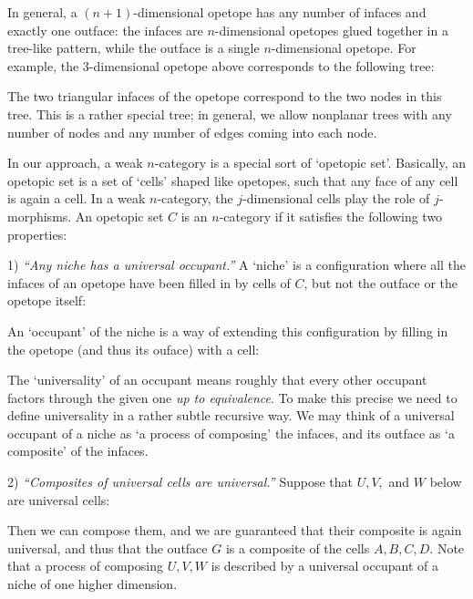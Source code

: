 In general, a $(n+1)$-dimensional opetope has any number of infaces and
exactly one outface: the infaces are $n$-dimensional opetopes glued
together in a tree-like pattern, while the outface is a single
$n$-dimensional opetope.  For example, the 3-dimensional opetope above
corresponds to the following tree:

\medskip
\centerline{\epsfysize=1.2in}
\medskip

\noindent The two triangular infaces of the opetope correspond to the
two nodes in this tree.  This is a rather special tree; in general, we
allow nonplanar trees with any number of nodes and any number of edges
coming into each node.

In our approach, a weak $n$-category is a special sort of `opetopic set'.
Basically, an opetopic set is a set of `cells' shaped like opetopes,
such that any face of any cell is again a cell.  In a weak $n$-category,
the $j$-dimensional cells play the role of $j$-morphisms.  An opetopic
set $C$ is an $n$-category if it satisfies the following two properties:

1) {\it ``Any niche has a universal occupant.''}  A `niche' is
a configuration where all the infaces of an opetope have been filled in
by cells of $C$, but not the outface or the opetope itself:

\medskip
\centerline{\epsfysize=1.5in}
\medskip

\noindent An `occupant' of the niche is a way of extending this configuration
by filling in the opetope (and thus its ouface) with a cell:

\medskip
\centerline{\epsfysize=1.5in}
\medskip

\noindent The `universality' of an occupant means roughly that every other
occupant factors through the given one {\it up to equivalence}.  To make
this precise we need to define universality in a rather subtle recursive
way.  We may think of a universal occupant of a niche as `a process of
composing' the infaces, and its outface as `a composite' of the infaces.

2) {\it ``Composites of universal cells are universal.''}  Suppose
that $U,V,$ and $W$ below are universal cells:

\medskip
\centerline{\epsfysize=2.0in}
\medskip

\noindent Then we can compose them, and we are guaranteed that their
composite is again universal, and thus that the outface $G$ is a composite
of the cells $A,B,C,D$.  Note that a process of composing $U,V,W$
is described by a universal occupant of a niche of one higher
dimension.  

